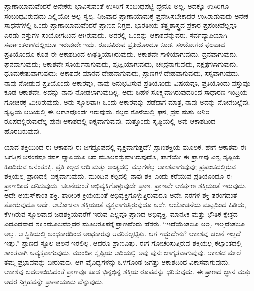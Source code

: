 ಪ್ರಾಣಾಯಾಮವೆಂದರೆ ಅನೇಕರು ಭಾವಿಸುವಂತೆ ಉಸಿರಿಗೆ ಸಂಬಂಧಪಟ್ಟಿ ದ್ದೇನೂ ಅಲ್ಲ. ಅದಕ್ಕೂ ಉಸಿರಿಗೂ ಸಂಬಂಧವಿರುವುದು ಎಲ್ಲಿಯೋ ಅಲ್ಪ ಸ್ವಲ್ಪ. ನಿಜವಾದ ಪ್ರಾಣಾಯಾಮಕ್ಕೆ ಪ್ರವೇಸಿಸಬೇಕಾದರೆ ಉಸಿರಾಡುವುದು ಅನೇಕ ಸಾಧನೆಗಳಲ್ಲಿ ಒಂದು ಪ್ರಾಣಾಯಾಮವೆಂದರೆ ಪ್ರಾಣದ ನಿಗ್ರಹ. ಭಾರತೀಯ ತತ್ತ್ವಶಾಸ್ತ್ರದ ಪ್ರಕಾರ ಪ್ರಪಂಚವೆಲ್ಲವೂ ಎರಡು ವಸ್ತುಗಳ ಸಂಯೋಗದಿಂದ ಆಗಿರುವುದು. ಅದರಲ್ಲಿ ಒಂದನ್ನು ಆಕಾಶವೆನ್ನುವರು. ಸರ್ವವ್ಯಾಪಿಯಾಗಿ ಸರ್ವಾಂತರಾಳದಲ್ಲಿಯೂ ಇರುವುದೇ ಇದು. ರೂಪವಿರುವ ಪ್ರತಿಯೊಂದೂ ಕೂಡ, ಸಂಯೋಗದ ಫಲವಾದ ಪ್ರತಿಯೊಂದೂ ಕೂಡ ಈ ಆಕಾಶದಿಂದ ಉತ್ಪತ್ತಿಯಾಗಿರುವುದು. ಆಕಾಶವೇ ಗಾಳಿಯಾಗುವುದು, ದ್ರವವಾಗುವುದು, ಘನವಾಗುವುದು; ಆಕಾಶವೇ ಸೂರ್ಯನಾಗುವುದು, ಪೃಥ್ವಿಯಾಗುವುದು, ಚಂದ್ರನಾಗುವುದು, ನಕ್ಷತ್ರಗಳಾಗುವುದು, ಧೂಮಕೇತುವಾಗುವುದು; ಆಕಾಶವೇ ಮಾನವ ದೇಹವಾಗುವುದು, ಪ್ರಾಣಿಗಳ ದೇಹವಾಗುವುದು, ಸಸ್ಯವಾಗುವುದು. ನಾವು ನೋಡುವ ಪ್ರತಿಯೊಂದು ಆಕಾರವೂ, ನಾವು ಅನುಭವಿಸುವ ಪ್ರತಿಯೊಂದು ವಿಷಯವೂ, ಪ್ರತಿಯೊಂದು ವಸ್ತುವೂ ಕೂಡ ಆಕಾಶವೇ. ಅದನ್ನು ನಾವು ನೋಡಲಾಗುವುದಿಲ್ಲ. ಅದು ಬಹಳ ಸೂಕ್ಷ್ಮವಾಗಿರುವುದರಿಂದ ಸಾಧಾರಣ ಇಂದ್ರಿಯ ಗೋಚರಕ್ಕೆ ಮೀರಿರುವುದು. ಅದು ಸ್ಥೂಲವಾಗಿ ಒಂದು ಆಕಾರವನ್ನು ಪಡೆದಾಗ ಮಾತ್ರ, ನಾವು ಅದನ್ನು ನೋಡಬಲ್ಲೆವು. ಸೃಷ್ಟಿಯ ಆದಿಯಲ್ಲಿ ಈ ಆಕಾಶವೊಂದೇ ಇರುವುದು. ಕಲ್ಪದ ಕೊನೆಯಲ್ಲಿ ಘನ, ದ್ರವ ಮತ್ತು ಅನಿಲ ರೂಪದಲ್ಲಿರುವುದೆಲ್ಲ ಪುನಃ ಆಕಾಶದಲ್ಲಿ ಐಕ್ಯವಾಗುವುವು. ಮತ್ತೊಂದು ಸೃಷ್ಟಿಯಲ್ಲಿ ಅವು ಆಕಾಶದಿಂದ ಹೊರಬರುವುವು. 

ಯಾವ ಶಕ್ತಿಯಿಂದ ಈ ಆಕಾಶವು ಈ ಜಗದ್ರೂಪದಲ್ಲಿ ವ್ಯಕ್ತವಾಗುತ್ತದೆ? ಪ್ರಾಣಶಕ್ತಿಯ ಮೂಲಕ. ಹೇಗೆ ಆಕಾಶವು ಈ ಜಗತ್ತಿನ ಅನಂತವೂ ಸರ್ವ ವ್ಯಾಪಿಯೂ ಆದ ಮೂಲವಸ್ತುವಾಗಿರುವುದೊ, ಹಾಗೆಯೇ ಈ ಪ್ರಾಣವು ವಿಶ್ವ ಸೃಷ್ಟಿಯ ಹಿಂದಿರುವ ಅನಂತಶಕ್ತಿ. ಪ್ರತಿ ಕಲ್ಪದ ಆದಿ ಮತ್ತು ಅಂತ್ಯದಲ್ಲಿ ವಸ್ತುಗಳೆಲ್ಲ ಆಕಾಶವಾಗುವುವು; ಪ್ರಪಂಚದಲ್ಲಿರುವ ಶಕ್ತಿಯೆಲ್ಲ ಪ್ರಾಣದಲ್ಲಿ ಐಕ್ಯವಾಗುವುದು. ಮುಂದಿನ ಕಲ್ಪದಲ್ಲಿ ನಾವು ಶಕ್ತಿ ಎಂದು ಕರೆಯುವ ಪ್ರತಿಯೊಂದೂ ಈ ಪ್ರಾಣದಿಂದ ಜನಿಸುವುದು. ಚಲನೆಯಂತೆ ಅಭಿವ್ಯಕ್ತಿಗೊಳ್ಳುವುದೇ ಪ್ರಾಣ. ಪ್ರಾಣವೇ ಆಕರ್ಷಣ ಶಕ್ತಿಯಂತೆ ಇರುವುದು. ಅದೇ ಅಯಸ್​ಕಾಂತ ಶಕ್ತಿ. ಶಾರೀರಿಕ ಕ್ರಿಯೆಯಂತೆ ಅಭಿವ್ಯಕ್ತಿಗೊಳ್ಳುತ್ತಿರುವುದೂ ಅದೇ. ನರಗಳ ಶಕ್ತಿ ತರಂಗದಂತೆ ತೋರುವುದೂ ಅದೇ. ಆಲೋಚನಾ ಶಕ್ತಿಯಂತೆ ವ್ಯಕ್ತವಾಗುತ್ತಿರುವುದೂ ಅದೇ. ಆಲೋಚನೆಯ ಮಟ್ಟದಿಂದ ಹಿಡಿದು, ಕೆಳಗಿರುವ ಸ್ಥೂಲವಾದ ಜಡಶಕ್ತಿಯವರೆಗೆ ಇರುವ ಎಲ್ಲವೂ ಪ್ರಾಣದ ಅಭಿವ್ಯಕ್ತಿ. ಮಾನಸಿಕ ಮತ್ತು ಭೌತಿಕ ಕ್ಷೇತ್ರದ ವಿಧವಿಧವಾದ ಶಕ್ತಿಸಮೂಲವೆಲ್ಲದರ ಮೂಲರೂಪಕ್ಕೆ ಪ್ರಾಣವೆಂದು ಹೆಸರು. “ಇದೆಯೆಂತಲೂ ಅಲ್ಲ. ಇಲ್ಲವೆಂತಲೂ ಅಲ್ಲ. ಆ ಸ್ಥಿತಿಯಲ್ಲಿ ಅಂಧಕಾರದಿಂದ ಅಂಧಕಾರವು ಆವರಿಸಲ್ಪಟ್ಟಿತ್ತು. ಆಗ ಇದ್ದುದೇನು? ಆಕಾಶವು ಚಲನೆ ಇಲ್ಲದೆ ಇತ್ತು.” ಪ್ರಾಣದ ಸ್ಥೂಲ ಚಲನೆ ಇರಲಿಲ್ಲ, ಆದರೂ ಪ್ರಾಣವಿತ್ತು. ಈಗ ಗೋಚರಿಸುತ್ತಿರುವ ಶಕ್ತಿಯೆಲ್ಲ ಕಲ್ಪಾಂತದಲ್ಲಿ ಶಾಂತವಾಗಿ ಅವ್ಯಕ್ತವಾಗುವುದು. ಮುಂದಿನ ಸೃಷ್ಟಿಯ ಆದಿಯಲ್ಲಿ ಅವು ಪುನಃ ಜಾಗೃತವಾಗುವುವು. ಆಕಾಶದ ಮೇಲೆ ತಮ್ಮ ಪ್ರಭಾವವನ್ನು ಬೀರುವುವು. ಆಗ ವೈವಿಧ್ಯಗಳನ್ನು ಒಳಗೊಂಡ ಜಗತ್ತು ಆಕಾಶದಿಂದ ವಿಕಾಸವಾಗುವುದು. ಆಕಾಶವು ಬದಲಾಯಿಸಿದಂತೆ ಪ್ರಾಣವೂ ಕೂಡ ಭಿನ್ನಭಿನ್ನ ಶಕ್ತಿಯ ರೂಪವನ್ನು ಧರಿಸುವುದು. ಈ ಪ್ರಾಣದ ಜ್ಞಾನ ಮತ್ತು ಅದರ ನಿಗ್ರಹವನ್ನೇ ಪ್ರಾಣಾಯಾಮ ವೆನ್ನುವುದು. 

